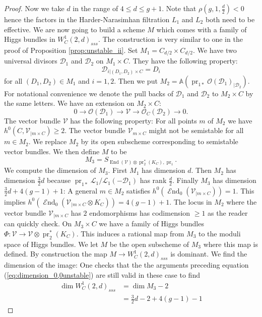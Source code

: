\documentclass[12pt]{extarticle}
\theoremstyle{definition}
\numberwithin{theorem}{section}
\newcommand{\Aff}{\mathbb{A}}
\newcommand{\OO}{\mathcal{O}}
\newcommand{\cL}{\mathcal{L}}
\newcommand{\cV}{\mathcal{V}}
\newcommand{\cD}{\mathcal{D}}
\newcommand{\op}{\operatorname}
\DeclareMathOperator{\End}{\mathcal{E}nd}
\begin{document}
\begin{proof}
Now we take $d$ in the range of $4\leq d \leq g+1$. Note that $\rho(g,1,\frac{d}{2}) < 0$ hence the factors in the Harder-Narasimhan filtration $L_1$ and $L_2$ both need to be effective. We are now going to build a scheme $M$ which comes with a family of Higgs bundles in $W_C^1(2,d)_{sss}$. The construction is very similar to one in the proof of Proposition \ref{prop:unstable_ii}. Set $M_1 = C_{d/2}\times C_{d/2}$. We have two universal divisors $\cD_1$ and $\cD_2$ on $M_1\times C$. They have the following property:
\begin{equation*}
\cD_{i|(D_1,D_2)\times C} = D_i
\end{equation*} 
for all $(D_1,D_2) \in M_1$ and $i=1,2$. Then we put $M_2 = \Aff(\op{pr}_{1*}\OO(\cD_1)_{|\cD_2})$. For notational convenience we denote the pull backs of $\cD_1$ and $\cD_2$ to $M_2 \times C$ by the same letters. We have an extension on $M_2 \times C$:
\begin{equation}
0 \to \OO(\cD_1) \to \cV \to \OO_C(\cD_2) \to 0.
\end{equation}
The vector bundle $\cV$ has the following property: For all points $m$ of $M_2$ we have $h^0(C,\cV_{|m\times C}) \geq 2$. The vector bundle $\cV_{m\times C}$ might not be semistable for all $m\in M_2$. We replace $M_2$ by its open subscheme corresponding to semistable vector bundles. We then define $M$ to be 
\begin{equation*}
M_3 = S_{\op{End}(\cV)\otimes \op{pr}_2^*(K_C),\op{pr}_1}.
\end{equation*}
We compute the dimension of $M_3$. First $M_1$ has dimension $d$. Then $M_2$ has dimension $\frac{3}{2}d$ because $\op{pr}_{1*}\cL_1/\cL_1(-\cD_1)$ has rank $\frac{d}{2}$. Finally $M_3$ has dimension $\frac{3}{2}d+4(g-1) +1$: A general $m \in M_2$ satisfies $h^0(\End_0(\cV_{|m\times C})) = 1$. This implies $h^0(\End_0(\cV_{|m\times C}\otimes K_C)) = 4(g-1)+1$. The locus in $M_2$ where the vector bundle $\cV_{|m\times C}$ has $2$ endomorphisms has codimension $\geq 1$ as the reader can quickly check. On $M_3\times C$ we have a family of Higgs bundles $\Phi: \cV\to \cV\otimes \op{pr}^*_2(K_C)$. This induces a rational map from $M_3$ to the moduli space of Higgs bundles. We let $M$ be the open subscheme of $M_3$ where this map is defined. By construction the map $M \to W_C^1(2,d)_{sss}$ is dominant. We find the dimension of the image: One checks that the the arguments preceding equation (\ref{eq:dimension_0,0unstable}) are still valid in these case to find 
\begin{align*}
\dim W_C^1(2,d)_{sss} &= \dim M_3 - 2\\
&= \frac{3}{2}d-2+4(g-1)-1
\end{align*}


\end{proof}
\end{document}
